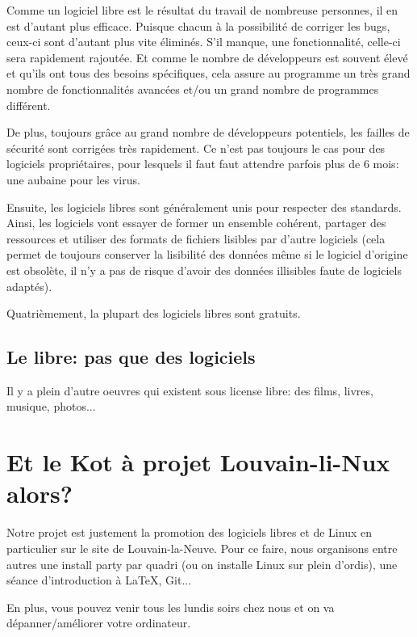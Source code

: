 \documentclass[11pt]{../fiche}
\begin{document}
Comme un logiciel libre est le résultat du travail de nombreuse personnes, il
en est d'autant plus efficace. Puisque chacun à la possibilité de corriger les
bugs, ceux-ci sont d'autant plus vite éliminés. S'il manque, une
fonctionnalité, celle-ci sera rapidement rajoutée. Et comme le nombre de
développeurs est souvent élevé et qu'ils ont tous des besoins spécifiques, cela
assure au programme un très grand nombre de fonctionnalités avancées et/ou un
grand nombre de programmes différent.

De plus, toujours grâce au grand nombre de développeurs potentiels,
les failles de sécurité sont corrigées très rapidement. Ce n'est pas
toujours le cas pour des logiciels propriétaires, pour lesquels il faut
faut attendre parfois plus de 6 mois: une aubaine pour les virus.

Ensuite, les logiciels libres sont généralement unis pour respecter des
standards. Ainsi, les logiciels vont essayer de former un ensemble cohérent,
partager des ressources et utiliser des formats de fichiers lisibles par
d'autre logiciels (cela permet de toujours conserver la lisibilité des données
même si le logiciel d'origine est obsolète, il n'y a pas de risque d'avoir des
données illisibles faute de logiciels adaptés).

Quatrièmement, la plupart des logiciels libres sont gratuits.

\subsection*{Le libre: pas que des logiciels}

Il y a plein d'autre oeuvres qui existent sous license libre: des films,
livres, musique, photos...

\section*{Et le Kot à projet Louvain-li-Nux alors?}
Notre projet est justement la promotion des logiciels libres et de Linux en particulier sur le site de Louvain-la-Neuve.
Pour ce faire, nous organisons entre autres une install party par quadri (ou on installe Linux sur plein d'ordis),
une séance d'introduction à \LaTeX{}, Git...

En plus, vous pouvez venir tous les lundis soirs chez nous et on va dépanner/améliorer votre ordinateur.
\end{document}
